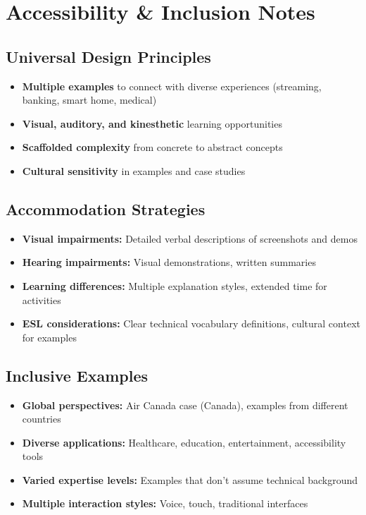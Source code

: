 \section{Accessibility \& Inclusion Notes}

\subsection{Universal Design Principles}
\begin{itemize}
    \item \textbf{Multiple examples} to connect with diverse experiences (streaming, banking, smart home, medical)
    \item \textbf{Visual, auditory, and kinesthetic} learning opportunities
    \item \textbf{Scaffolded complexity} from concrete to abstract concepts
    \item \textbf{Cultural sensitivity} in examples and case studies
\end{itemize}

\subsection{Accommodation Strategies}
\begin{itemize}
    \item \textbf{Visual impairments:} Detailed verbal descriptions of screenshots and demos
    \item \textbf{Hearing impairments:} Visual demonstrations, written summaries
    \item \textbf{Learning differences:} Multiple explanation styles, extended time for activities
    \item \textbf{ESL considerations:} Clear technical vocabulary definitions, cultural context for examples
\end{itemize}

\subsection{Inclusive Examples}
\begin{itemize}
    \item \textbf{Global perspectives:} Air Canada case (Canada), examples from different countries
    \item \textbf{Diverse applications:} Healthcare, education, entertainment, accessibility tools
    \item \textbf{Varied expertise levels:} Examples that don't assume technical background
    \item \textbf{Multiple interaction styles:} Voice, touch, traditional interfaces
\end{itemize}

